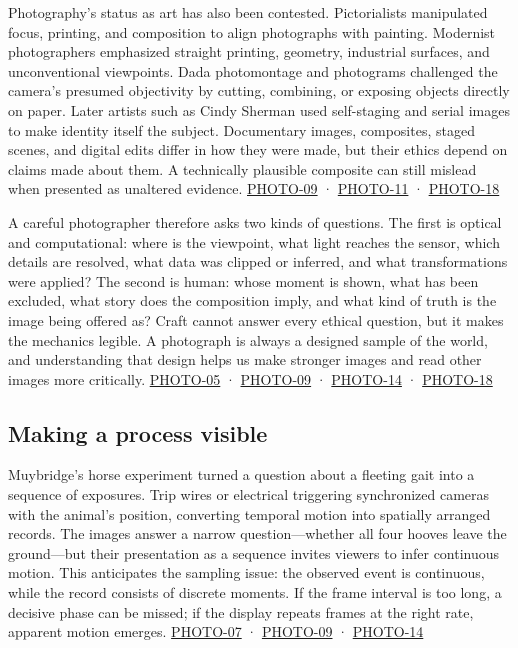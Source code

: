 Photography's status as art has also been contested. Pictorialists manipulated focus, printing, and composition to align photographs with painting. Modernist photographers emphasized straight printing, geometry, industrial surfaces, and unconventional viewpoints. Dada photomontage and photograms challenged the camera's presumed objectivity by cutting, combining, or exposing objects directly on paper. Later artists such as Cindy Sherman used self-staging and serial images to make identity itself the subject. Documentary images, composites, staged scenes, and digital edits differ in how they were made, but their ethics depend on claims made about them. A technically plausible composite can still mislead when presented as unaltered evidence. \hyperref[04-visual-computing-ii-ch036-photo-09---photography-session-09]{PHOTO-09} · \hyperref[04-visual-computing-ii-ch036-photo-11---photography-session-11]{PHOTO-11} · \hyperref[04-visual-computing-ii-ch036-photo-18---photography-session-18]{PHOTO-18}

A careful photographer therefore asks two kinds of questions. The first is optical and computational: where is the viewpoint, what light reaches the sensor, which details are resolved, what data was clipped or inferred, and what transformations were applied? The second is human: whose moment is shown, what has been excluded, what story does the composition imply, and what kind of truth is the image being offered as? Craft cannot answer every ethical question, but it makes the mechanics legible. A photograph is always a designed sample of the world, and understanding that design helps us make stronger images and read other images more critically. \hyperref[04-visual-computing-ii-ch036-photo-05---photography-session-05]{PHOTO-05} · \hyperref[04-visual-computing-ii-ch036-photo-09---photography-session-09]{PHOTO-09} · \hyperref[04-visual-computing-ii-ch036-photo-14---photography-session-14]{PHOTO-14} · \hyperref[04-visual-computing-ii-ch036-photo-18---photography-session-18]{PHOTO-18}

\subsection{Making a process visible}\label{04-visual-computing-ii-ch034-making-a-process-visible}

Muybridge's horse experiment turned a question about a fleeting gait into a sequence of exposures. Trip wires or electrical triggering synchronized cameras with the animal's position, converting temporal motion into spatially arranged records. The images answer a narrow question---whether all four hooves leave the ground---but their presentation as a sequence invites viewers to infer continuous motion. This anticipates the sampling issue: the observed event is continuous, while the record consists of discrete moments. If the frame interval is too long, a decisive phase can be missed; if the display repeats frames at the right rate, apparent motion emerges. \hyperref[04-visual-computing-ii-ch036-photo-07---photography-session-07]{PHOTO-07} · \hyperref[04-visual-computing-ii-ch036-photo-09---photography-session-09]{PHOTO-09} · \hyperref[04-visual-computing-ii-ch036-photo-14---photography-session-14]{PHOTO-14}

